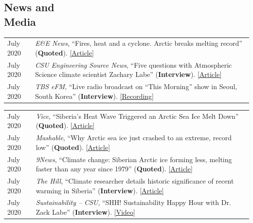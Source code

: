 \documentclass[margin,line,palatino,courier,10pt]{res}
\begin{document}
\begin{resume}
\section{\sc \textcolor{Cerulean}{\large{\textbf{News and\\ Media}}}}
\vspace*{0.04in}
\begin{tabular}{@{}p{0.9in}p{4in}}
July 2020 & \textit{E\&E News}, ``Fires, heat and a cyclone. Arctic breaks melting record'' (\textbf{Quoted}). \href{https://www.eenews.net/stories/1063658765}{[Article]}\\
July 2020 & \textit{CSU Engineering Source News}, ``Five questions with Atmospheric Science climate scientist Zachary Labe'' (\textbf{Interview}). \href{https://engr.source.colostate.edu/five-questions-with-climate-scientist-zachary-labe/}{[Article]}\\
July 2020 & \textit{TBS eFM}, ``Live radio broadcast on “This Morning” show in Seoul, South Korea'' (\textbf{Interview}). \href{https://podcasts.apple.com/kr/podcast/0724-in-focus-1-effects-human-induced-climate-change/id1038822609?i=1000485914634&l=en}{[Recording]}\\
\end{tabular}
\begin{tabular}{@{}p{0.9in}p{4in}}
July 2020 & \textit{Vice}, ``Siberia's Heat Wave Triggered an Arctic Sea Ice Melt Down'' (\textbf{Quoted}). \href{https://www.vice.com/en_us/article/ep45be/siberias-heat-wave-triggered-an-arctic-sea-ice-melt-down}{[Article]}\\
July 2020 & \textit{Mashable}, ``Why Arctic sea ice just crashed to an extreme, record low'' (\textbf{Quoted}). \href{https://mashable.com/article/arctic-sea-ice-plummets-2020/}{[Article]}\\
July 2020 & \textit{9News}, ``Climate change: Siberian Arctic ice forming less, melting faster than any year since 1979'' (\textbf{Quoted}). \href{https://www.9news.com.au/world/climate-change-global-warming-siberian-heatwave-arctic-ice-melting-faster-us-research-data/}{[Article]}\\
July 2020 & \textit{The Hill}, ``Climate researcher details historic significance of recent warming in Siberia'' (\textbf{Interview}). \href{https://thehill.com/hilltv/rising/507850-climate-researcher-details-historic-significance-of-recent-warming-in-siberia}{[Article]}\\
July 2020 & \textit{Sustainability -- CSU}, ``SHH! Sustainability Happy Hour with Dr. Zack Labe'' (\textbf{Interview}). \href{https://www.youtube.com/watch?v=E6htTPoeXQ8&feature=youtu.be}{[Video]}\\

\end{tabular}
\end{resume}
\end{document}
